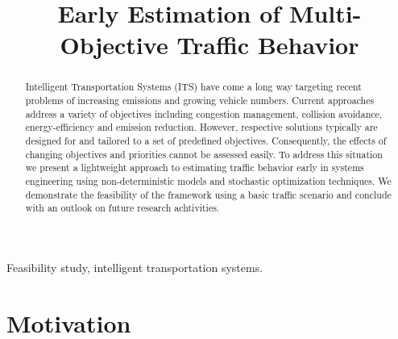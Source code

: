 \documentclass[conference]{../cls/IEEEtran}
\begin{document}
\title{Early Estimation of Multi-Objective Traffic Behavior}

\author{
	\and
}

\maketitle

\begin{abstract}
Intelligent Transportation Systems (ITS) have come a long way targeting recent problems of increasing emissions and growing vehicle numbers. Current approaches address a variety of objectives including congestion management, collision avoidance, energy-efficiency and emission reduction. However, respective solutions typically are designed for and tailored to a set of predefined objectives. Consequently, the effects of changing objectives and priorities cannot be assessed easily. To address this situation we present a lightweight approach to estimating traffic behavior early in systems engineering using non-deterministic models and stochastic optimization techniques. We demonstrate the feasibility of the framework using a basic traffic scenario and conclude with an outlook on future research achtivities.
\end{abstract}

\begin{IEEEkeywords}
Feasibility study, intelligent transportation systems.
\end{IEEEkeywords}

\section{Motivation}
\label{sec:motivation}
\end{document}
